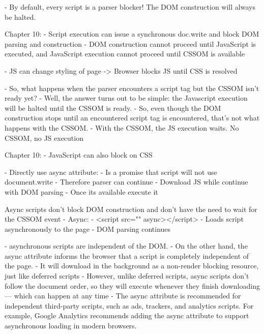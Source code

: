 - By default, every script is a parser blocker! The DOM construction will always be halted.


Chapter 10:
- Script execution can issue a synchronous doc.write and block DOM parsing and construction
- DOM construction cannot proceed until JavaScript is executed, and JavaScript execution cannot proceed until CSSOM is available








- JS can change styling of page -> Browser blocks JS until CSS is resolved

- So, what happens when the parser encounters a script tag but the CSSOM isn’t ready yet?
- Well, the answer turns out to be simple: the Javascript execution will be halted until the CSSOM is ready.
- So, even though the DOM construction stops until an encountered script tag is encountered, that’s not what happens with the CSSOM.
- With the CSSOM, the JS execution waits. No CSSOM, no JS execution


Chapter 10:
- JavaScript can also block on CSS







- Directly use async attribute:
	- Is a promise that script will not use document.write
	- Therefore parser can continue
	- Download JS while continue with DOM parsing
	- Once its available execute it


Async scripts don’t block DOM construction and don’t have the need to wait for the CSSOM event
- Async:
	- <script src="" async></script>
	- Loads script asynchronously to the page
	- DOM parsing continues
	
	
- asynchronous scripts are independent of the DOM.
- On the other hand, the async attribute informs the browser that a script is completely independent of the page.
-  It will download in the background as a non-render blocking resource, just like deferred scripts
- However, unlike deferred scripts, async scripts don’t follow the document order, so they will execute whenever they finish downloading — which can happen at any time
- The async attribute is recommended for independent third-party scripts, such as ads, trackers, and analytics scripts. For example, Google Analytics recommends adding the async attribute to support asynchronous loading in modern browsers.

